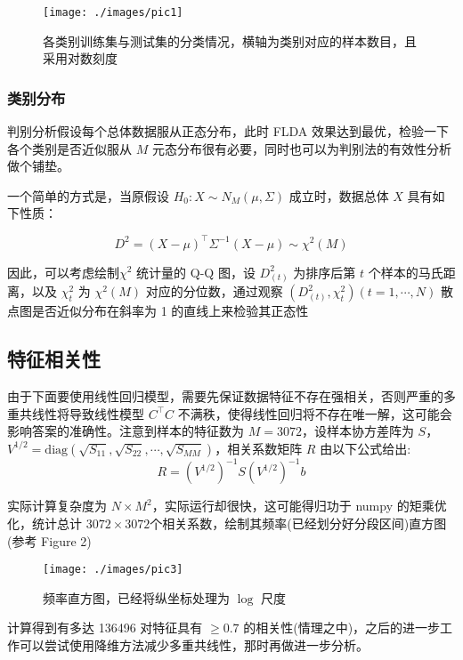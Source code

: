 \documentclass[fleqn]{Paquetes/RevDigMatEduInt}
\begin{document}
\begin{figure}[h]
	\centering
	\texttt{[image: ./images/pic1]}
	\caption{各类别训练集与测试集的分类情况，横轴为类别对应的样本数目，且采用对数刻度}
\end{figure}

\subsubsection{类别分布}

判别分析假设每个总体数据服从正态分布，此时 FLDA 效果达到最优，检验一下各个类别是否近似服从 $M$ 元态分布很有必要，同时也可以为判别法的有效性分析做个铺垫。

一个简单的方式是，当原假设 $H_0:X\sim N_M(\mu,\Sigma)$ 成立时，数据总体 $X$ 具有如下性质：

\begin{lema}
$$D^2 = (X - \mu)^\top \Sigma^{-1} (X - \mu) \sim \chi^2(M)$$
\end{lema}

因此，可以考虑绘制$\chi^2$ 统计量的 Q-Q 图，设 $D_{(t)}^2$ 为排序后第 $t$ 个样本的马氏距离，以及 $\chi_t^2$ 为 $\chi^2(M)$ 对应的分位数，通过观察 $(D_{(t)}^2,\chi_t^2)(t = 1,\cdots,N)$ 散点图是否近似分布在斜率为 1 的直线上来检验其正态性


\subsection{特征相关性}

由于下面要使用线性回归模型，需要先保证数据特征不存在强相关，否则严重的多重共线性将导致线性模型 $C^\top C$ 不满秩，使得线性回归将不存在唯一解，这可能会影响答案的准确性。注意到样本的特征数为 $M = 3072$，设样本协方差阵为 $S$，$V^{1/2} = \mathrm{diag}(\sqrt{S_{11}},  \sqrt{S_{22}},\cdots,\sqrt{S_{MM}})$，相关系数矩阵  $R$ 由以下公式给出:
$$
R = (V^{1/2})^{-1}S(V^{1/2})^{-1}b 
$$

实际计算复杂度为 $N \times M^2$，实际运行却很快，这可能得归功于 numpy 的矩乘优化，统计总计 $3072 \times 3072$个相关系数，绘制其频率(已经划分好分段区间)直方图(参考 Figure 2)

\begin{figure}[h]
	\centering
	\texttt{[image: ./images/pic3]}
	\caption{频率直方图，已经将纵坐标处理为 $\log$ 尺度}
\end{figure}

计算得到有多达 136496 对特征具有 $\geq 0.7$ 的相关性(情理之中)，之后的进一步工作可以尝试使用降维方法减少多重共线性，那时再做进一步分析。
\end{document}
